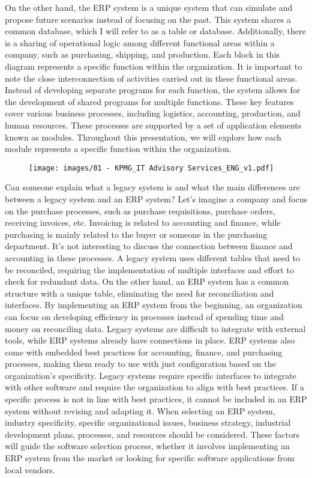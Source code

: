 On the other hand, the ERP system is a
unique system that can simulate and propose future scenarios instead of
focusing on the past. This system shares a common database, which I will
refer to as a table or database. Additionally, there is a sharing of
operational logic among different functional areas within a company,
such as purchasing, shipping, and production. Each block in this diagram
represents a specific function within the organization. It is important
to note the close interconnection of activities carried out in these
functional areas. Instead of developing separate programs for each
function, the system allows for the development of shared programs for
multiple functions. These key features cover various business processes,
including logistics, accounting, production, and human resources. These
processes are supported by a set of application elements known as
modules. Throughout this presentation, we will explore how each module
represents a specific function within the organization.

\begin{figure}[!h]
    \centering
    \texttt{[image: images/01 - KPMG\_IT Advisory Services\_ENG\_v1.pdf]}
\end{figure}

Can someone explain what a legacy system is and what the main
differences are between a legacy system and an ERP system? Let's imagine a
company and focus on the purchase processes, such as purchase
requisitions, purchase orders, receiving invoices, etc. Invoicing is
related to accounting and finance, while purchasing is mainly related to
the buyer or someone in the purchasing department. It's not interesting
to discuss the connection between finance and accounting in these
processes. A legacy system uses different tables that need to be
reconciled, requiring the implementation of multiple interfaces and
effort to check for redundant data. On the other hand, an ERP system has
a common structure with a unique table, eliminating the need for
reconciliation and interfaces. By implementing an ERP system from the
beginning, an organization can focus on developing efficiency in
processes instead of spending time and money on reconciling data. Legacy
systems are difficult to integrate with external tools, while ERP
systems already have connections in place. ERP systems also come with
embedded best practices for accounting, finance, and purchasing
processes, making them ready to use with just configuration based on the
organization's specificity. Legacy systems require specific interfaces
to integrate with other software and require the organization to align
with best practices. If a specific process is not in line with best
practices, it cannot be included in an ERP system without revising and
adapting it. When selecting an ERP system, industry specificity,
specific organizational issues, business strategy, industrial
development plans, processes, and resources should be considered. These
factors will guide the software selection process, whether it involves
implementing an ERP system from the market or looking for specific
software applications from local vendors.

